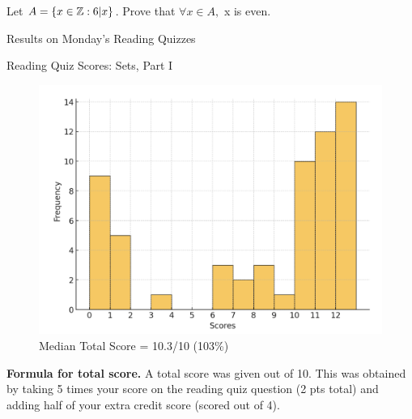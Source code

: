 \documentclass[10pt]{beamer}
\begin{document}
\begin{frame}
\footnotesize 
%

 \begin{myredbox}[title=Reading Quiz (Quantifiers)]
Let $A = \{ {x \in \mathbb{Z}: 6|x} \}$.  Prove that $\forall x \in A, $ x is even.
\end{myredbox}
\end{frame}


\begin{frame}[standout]
Results on Monday's Reading Quizzes
\end{frame}


\begin{frame}{Reading Quiz Scores: Sets, Part I}
\footnotesize 

\begin{figure}[ht]
        \centering
        \includegraphics[width=.75\textwidth]{images/reading_quiz_scores}
        \caption{Median Total Score = 10.3/10 (103\%)}
\end{figure}
\vfill 
\textbf{Formula for total score.} A total score was given out of 10. This was obtained by taking 5 times your score on the reading quiz question (2 pts total)  and adding half of your extra credit score (scored out of 4). 
\end{frame}
\end{document}
